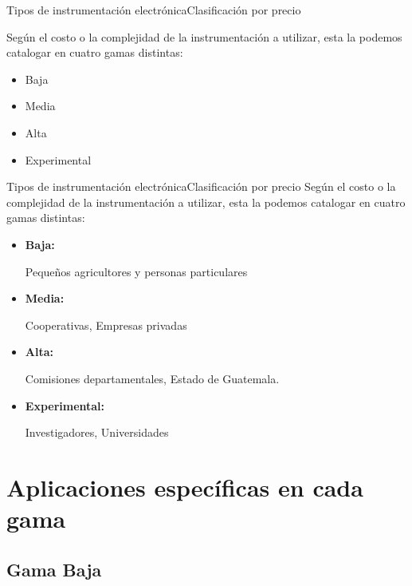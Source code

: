 \documentclass[]{beamer}
\begin{document}
\begin{frame}{Tipos de instrumentación electrónica}{Clasificación por precio}

  Según el costo o la complejidad de la instrumentación a utilizar, esta la podemos catalogar en cuatro gamas distintas:
  \begin{itemize}
    \item Baja
    \item Media
    \item Alta
    \item Experimental
  \end{itemize}
\end{frame}

\begin{frame}{Tipos de instrumentación electrónica}{Clasificación por precio}
  Según el costo o la complejidad de la instrumentación a utilizar, esta la podemos catalogar en cuatro gamas distintas:
  \begin{itemize}
    \item \textbf{Baja:}

      Pequeños agricultores y personas particulares
    \item \textbf{Media:}

      Cooperativas, Empresas privadas

    \item \textbf{Alta:}

      Comisiones departamentales, Estado de Guatemala.
    \item \textbf{Experimental:}

      Investigadores, Universidades
  \end{itemize}
\end{frame}

\section{Aplicaciones específicas en cada gama}

\subsection{Gama Baja}
\end{document}
